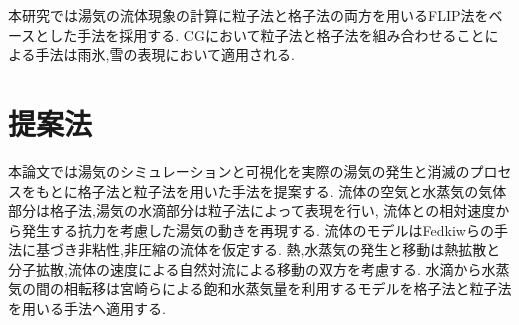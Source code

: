 本研究では湯気の流体現象の計算に粒子法と格子法の両方を用いるFLIP法をベースとした手法を採用する.
CGにおいて粒子法と格子法を組み合わせることによる手法は雨氷\cite{Ishikawa2015},雪\cite{Stomakhin2013}の表現において適用される.

\section{提案法}
本論文では湯気のシミュレーションと可視化を実際の湯気の発生と消滅のプロセスをもとに格子法と粒子法を用いた手法を提案する.
流体の空気と水蒸気の気体部分は格子法,湯気の水滴部分は粒子法によって表現を行い,
流体との相対速度から発生する抗力を考慮した湯気の動きを再現する.
流体のモデルはFedkiwら\cite{Fedkiw2001}の手法に基づき非粘性,非圧縮の流体を仮定する.
熱,水蒸気の発生と移動は熱拡散と分子拡散,流体の速度による自然対流による移動の双方を考慮する.
水滴から水蒸気の間の相転移は宮崎ら\cite{Miyazaki2001}\cite{Miyazaki2002}による飽和水蒸気量を利用するモデルを格子法と粒子法を用いる手法へ適用する.
